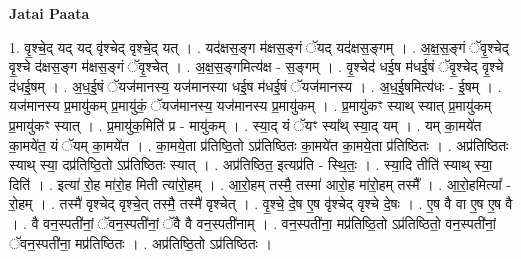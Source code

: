 \documentclass[17pt]{extarticle}
\begin{document}
\textbf{Jatai Paata} \newline

1. वृ॒श्चे॒द् यद् यद् वृ॑श्चेद् वृश्चे॒द् यत् । . यद॑क्षस॒ङ्ग म॑क्षस॒ङ्गं ॅयद् यद॑क्षस॒ङ्गम् । . अ॒क्ष॒स॒ङ्गं ॅवृ॒श्चेद् वृ॒श्चे द॑क्षस॒ङ्ग म॑क्षस॒ङ्गं ॅवृ॒श्चेत् । . अ॒क्ष॒स॒ङ्गमित्य॑क्ष - स॒ङ्गम् । . वृ॒श्चेद॑ धई॒ष म॑धई॒षं ॅवृ॒श्चेद् वृ॒श्चे द॑धई॒षम् । . अ॒ध॒ई॒षं ॅयज॑मानस्य॒ यज॑मानस्या धई॒ष म॑धई॒षं ॅयज॑मानस्य । . अ॒ध॒ई॒षमित्य॑धः - ई॒षम् । . यज॑मानस्य प्र॒मायु॑कम् प्र॒मायु॑कं॒ ॅयज॑मानस्य॒ यज॑मानस्य प्र॒मायु॑कम् । . प्र॒मायु॑कꣳ स्याथ् स्यात् प्र॒मायु॑कम् प्र॒मायु॑कꣳ स्यात् । . प्र॒मायु॑क॒मिति॑ प्र - मायु॑कम् । . स्या॒द् यं ॅयꣳ स्या᳚थ् स्या॒द् यम् । . यम् का॒मये॑त का॒मये॑त॒ यं ॅयम् का॒मये॑त । . का॒मये॒ता प्र॑तिष्ठि॒तो ऽप्र॑तिष्ठितः का॒मये॑त का॒मये॒ता प्र॑तिष्ठितः । . अप्र॑तिष्ठितः स्याथ् स्या॒ दप्र॑तिष्ठि॒तो ऽप्र॑तिष्ठितः स्यात् । . अप्र॑तिष्ठित॒ इत्यप्र॑ति - स्थि॒तः॒ । . स्या॒दि तीति॑ स्याथ् स्या॒ दिति॑ । . इत्या॑ रो॒ह मा॑रो॒ह मिती त्या॑रो॒हम् । . आ॒रो॒हम् तस्मै॒ तस्मा॑ आरो॒ह मा॑रो॒हम् तस्मै᳚ । . आ॒रो॒हमित्या᳚ - रो॒हम् । . तस्मै॑ वृश्चेद् वृश्चे॒त् तस्मै॒ तस्मै॑ वृश्चेत् । . वृ॒श्चे॒ दे॒ष ए॒ष वृ॑श्चेद् वृश्चे दे॒षः । . ए॒ष वै वा ए॒ष ए॒ष वै । . वै वन॒स्पती॑नां॒ ॅवन॒स्पती॑नां॒ ॅवै वै वन॒स्पती॑नाम् । . वन॒स्पती॑ना॒ मप्र॑तिष्ठि॒तो ऽप्र॑तिष्ठितो॒ वन॒स्पती॑नां॒ ॅवन॒स्पती॑ना॒ मप्र॑तिष्ठितः । . अप्र॑तिष्ठि॒तो ऽप्र॑तिष्ठितः । \newline
\end{document}

